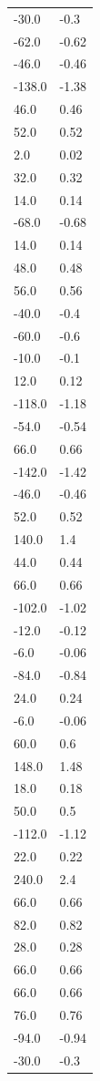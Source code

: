 \begin{longtable}{ll}
-30.0 & -0.3 \\
-62.0 & -0.62 \\
-46.0 & -0.46 \\
-138.0 & -1.38 \\
46.0 & 0.46 \\
52.0 & 0.52 \\
2.0 & 0.02 \\
32.0 & 0.32 \\
14.0 & 0.14 \\
-68.0 & -0.68 \\
14.0 & 0.14 \\
48.0 & 0.48 \\
56.0 & 0.56 \\
-40.0 & -0.4 \\
-60.0 & -0.6 \\
-10.0 & -0.1 \\
12.0 & 0.12 \\
-118.0 & -1.18 \\
-54.0 & -0.54 \\
66.0 & 0.66 \\
-142.0 & -1.42 \\
-46.0 & -0.46 \\
52.0 & 0.52 \\
140.0 & 1.4 \\
44.0 & 0.44 \\
66.0 & 0.66 \\
-102.0 & -1.02 \\
-12.0 & -0.12 \\
-6.0 & -0.06 \\
-84.0 & -0.84 \\
24.0 & 0.24 \\
-6.0 & -0.06 \\
60.0 & 0.6 \\
148.0 & 1.48 \\
18.0 & 0.18 \\
50.0 & 0.5 \\
-112.0 & -1.12 \\
22.0 & 0.22 \\
240.0 & 2.4 \\
66.0 & 0.66 \\
82.0 & 0.82 \\
28.0 & 0.28 \\
66.0 & 0.66 \\
66.0 & 0.66 \\
76.0 & 0.76 \\
-94.0 & -0.94 \\
-30.0 & -0.3 \\

\end{longtable}
